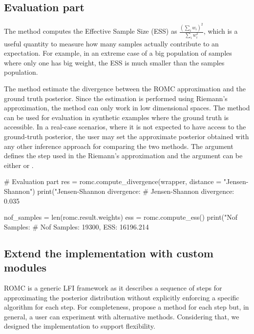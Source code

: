 \documentclass[article, shortnames]{jss}
\begin{document}
\subsection{Evaluation part}
\label{subsec:evaluation}

The method  computes the Effective Sample
Size (ESS) as \(\frac{(\sum_i w_i)^2}{\sum_i w_i^2}\), which is a
useful quantity to measure how many samples actually contribute to an
expectation. For example, in an extreme case of a big population of
samples where only one has big weight, the ESS is much smaller than
the samples population.

\noindent
The method  estimate the divergence between the ROMC approximation
and the ground truth posterior. Since the estimation is performed
using Riemann's approximation, the method can only work in low
dimensional spaces. The method can be used for evaluation in synthetic
examples where the ground truth is accessible. In a real-case
scenarios, where it is not expected to have access to the ground-truth
posterior, the user may set the approximate posterior obtained with
any other inference approach for comparing the two methods. The
argument  defines the step used in the Riemann's
approximation and the argument  can be either
 or .

\begin{Code}
# Evaluation part
res = romc.compute_divergence(wrapper, distance = "Jensen-Shannon")
print("Jensen-Shannon divergence: %
# Jensen-Shannon divergence: 0.035

nof_samples = len(romc.result.weights)
ess = romc.compute_ess()
print("Nof Samples: %
# Nof Samples: 19300, ESS: 16196.214
\end{Code}


\subsection{Extend the implementation with custom modules}
\label{subsec:extensibility}

ROMC is a generic LFI framework as it describes a sequence of steps
for approximating the posterior distribution without explicitly
enforcing a specific algorithm for each step. For completeness,
\cite{Ikonomov2019} propose a method for each step but, in general, a
user can experiment with alternative methods. Considering that, we
designed the implementation to support flexibility.
\end{document}
